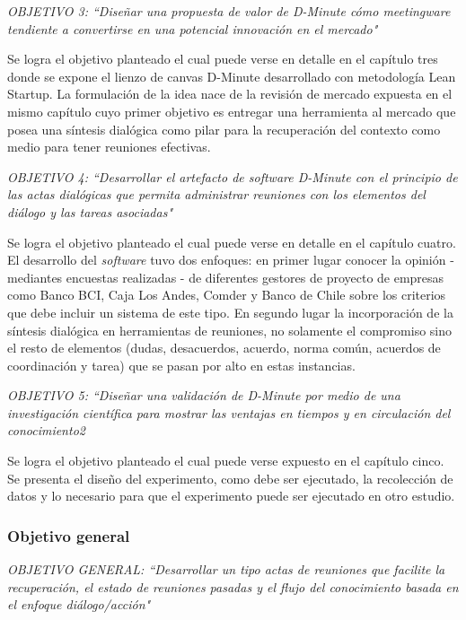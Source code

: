 \textit{OBJETIVO 3:  “Dise\~nar una propuesta de valor de D-Minute cómo \textit{meetingware} tendiente a convertirse en una potencial innovación en el mercado"}\newline

Se logra el objetivo planteado el cual puede verse en detalle en el capítulo tres donde se expone el lienzo de canvas D-Minute desarrollado con metodología Lean Startup. La formulación de la idea nace de la revisión de mercado expuesta en el mismo capítulo cuyo primer objetivo es entregar una herramienta al mercado que posea una síntesis dialógica como pilar para la recuperación del contexto como medio para tener reuniones efectivas.\newline

\textit{OBJETIVO 4:  “Desarrollar el artefacto de \textit{software} D-Minute con el principio de las actas dialógicas que permita administrar reuniones con los elementos del diálogo y las tareas asociadas"}\newline

Se logra el objetivo planteado el cual puede verse en detalle en el capítulo cuatro. El desarrollo del \textit{software} tuvo dos enfoques: en primer lugar conocer la opinión  - mediantes encuestas realizadas - de diferentes gestores de proyecto de empresas como Banco BCI, Caja Los Andes, Comder y Banco de Chile sobre los criterios que debe incluir un sistema de este tipo. En segundo lugar la incorporación de la síntesis dialógica en herramientas de reuniones, no solamente el compromiso sino el resto de elementos (dudas, desacuerdos, acuerdo, norma común, acuerdos de coordinación y tarea) que se pasan por alto en estas instancias.\newline

\textit{OBJETIVO 5:  “Dise\~nar una validación de D-Minute por medio de una investigación científica para mostrar las ventajas en tiempos y en circulación del conocimiento2}\newline

Se logra el objetivo planteado el cual puede verse expuesto en el capítulo cinco. Se presenta el diseño del experimento, como debe ser ejecutado, la recolección de datos y lo necesario para que el experimento puede ser ejecutado en otro estudio.

\subsubsection{Objetivo general}

\textit{OBJETIVO GENERAL: “Desarrollar un tipo actas de reuniones que facilite la recuperación, el estado de reuniones pasadas y el flujo del conocimiento basada en el enfoque diálogo/acción"}\newline

